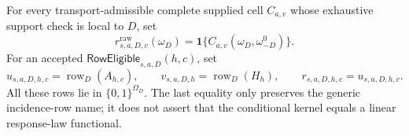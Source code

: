 For every transport-admissible complete supplied cell \(C_{a,v}\) whose exhaustive support check is local to \(D\), set
\[
r^{\mathrm{raw}}_{s,a,D,v}(\omega_D)=\mathbf1\{C_{a,v}(\omega_D,\omega_{-D}^0)\}.
\]
For an accepted \(\mathsf{RowEligible}_{s,a,D}(h,c)\), set
\[
u_{s,a,D,h,c}=\operatorname{row}_D(A_{h,c}),\qquad
v_{s,a,D,h}=\operatorname{row}_D(H_h),\qquad
r_{s,a,D,h,c}=u_{s,a,D,h,c}.
\]
All these rows lie in \(\{0,1\}^{\Omega_D}\).  The last equality only preserves the generic incidence-row name; it does not assert that the conditional kernel equals a linear response-law functional.